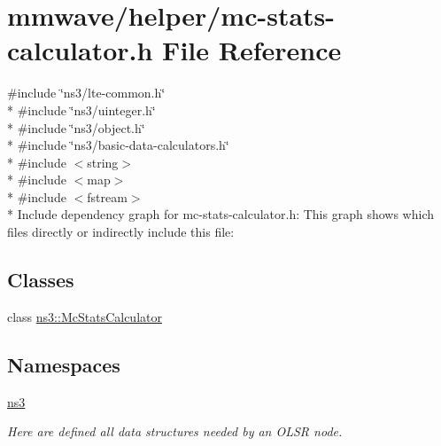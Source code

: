 \hypertarget{mc-stats-calculator_8h}{}\section{mmwave/helper/mc-\/stats-\/calculator.h File Reference}
\label{mc-stats-calculator_8h}
{\ttfamily \#include \char`\"{}ns3/lte-\/common.\+h\char`\"{}}\\*
{\ttfamily \#include \char`\"{}ns3/uinteger.\+h\char`\"{}}\\*
{\ttfamily \#include \char`\"{}ns3/object.\+h\char`\"{}}\\*
{\ttfamily \#include \char`\"{}ns3/basic-\/data-\/calculators.\+h\char`\"{}}\\*
{\ttfamily \#include $<$string$>$}\\*
{\ttfamily \#include $<$map$>$}\\*
{\ttfamily \#include $<$fstream$>$}\\*
Include dependency graph for mc-\/stats-\/calculator.h\+:
This graph shows which files directly or indirectly include this file\+:
\subsection*{Classes}
\begin{DoxyCompactItemize}
\item 
class \hyperlink{classns3_1_1McStatsCalculator}{ns3\+::\+Mc\+Stats\+Calculator}
\end{DoxyCompactItemize}
\subsection*{Namespaces}
\begin{DoxyCompactItemize}
\item 
 \hyperlink{namespacens3}{ns3}
\begin{DoxyCompactList}\small\item\em Here are defined all data structures needed by an O\+L\+SR node. \end{DoxyCompactList}\end{DoxyCompactItemize}
